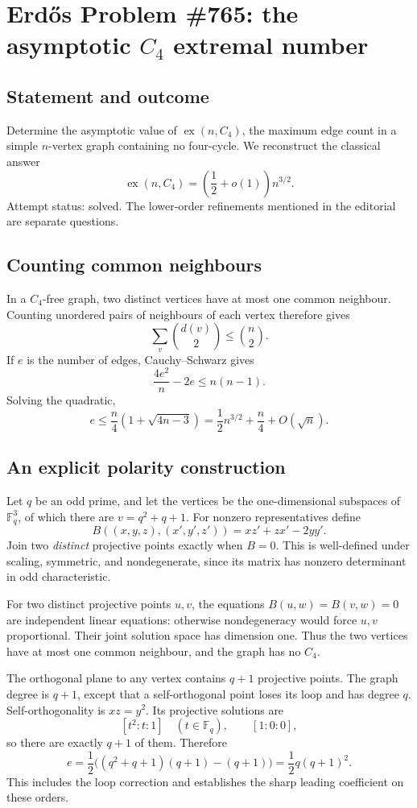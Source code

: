 \section*{Erd\H{o}s Problem \#765: the asymptotic \(C_4\) extremal number}
\subsection*{Statement and outcome}
Determine the asymptotic value of \(\operatorname{ex}(n,C_4)\), the maximum edge count in a simple \(n\)-vertex graph containing no four-cycle. We reconstruct the classical answer
\[
\operatorname{ex}(n,C_4)=\left(\frac12+o(1)\right)n^{3/2}.
\]
Attempt status: solved. The lower-order refinements mentioned in the editorial are separate questions.

\subsection*{Counting common neighbours}
In a \(C_4\)-free graph, two distinct vertices have at most one common neighbour. Counting unordered pairs of neighbours of each vertex therefore gives
\[
\sum_{v}\binom{d(v)}2\leq\binom n2.
\]
If \(e\) is the number of edges, Cauchy--Schwarz gives
\[
\frac{4e^2}{n}-2e\leq n(n-1).
\]
Solving the quadratic,
\[
e\leq\frac n4\left(1+\sqrt{4n-3}\right)
=\frac12n^{3/2}+\frac n4+O(\sqrt n). \tag{1}
\]

\subsection*{An explicit polarity construction}
Let \(q\) be an odd prime, and let the vertices be the one-dimensional subspaces of \(\mathbb F_q^3\), of which there are \(v=q^2+q+1\). For nonzero representatives define
\[
B((x,y,z),(x',y',z'))=xz'+zx'-2yy'.
\]
Join two \emph{distinct} projective points exactly when \(B=0\). This is well-defined under scaling, symmetric, and nondegenerate, since its matrix has nonzero determinant in odd characteristic.

For two distinct projective points \(u,v\), the equations \(B(u,w)=B(v,w)=0\) are independent linear equations: otherwise nondegeneracy would force \(u,v\) proportional. Their joint solution space has dimension one. Thus the two vertices have at most one common neighbour, and the graph has no \(C_4\).

The orthogonal plane to any vertex contains \(q+1\) projective points. The graph degree is \(q+1\), except that a self-orthogonal point loses its loop and has degree \(q\). Self-orthogonality is \(xz=y^2\). Its projective solutions are
\[
[t^2:t:1]\quad(t\in\mathbb F_q),\qquad [1:0:0],
\]
so there are exactly \(q+1\) of them. Therefore
\[
e=\frac12\big((q^2+q+1)(q+1)-(q+1)\big)
=\frac12q(q+1)^2. \tag{2}
\]
This includes the loop correction and establishes the sharp leading coefficient on these orders.

